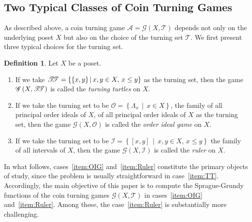 \documentclass[a4paper,11pt]{amsart}
\theoremstyle{definition}
\newtheorem{dfn}{Definition}[section]
\numberwithin{equation}{section}
\def\Game{\mathscr{A}}
\def\Pgame{\mathscr{G}}
\def\T{\mathscr{T}}
\def\TT{\mathscr{T}\kern-4pt\mathscr{T}}
\def\OI{\mathscr{O}}
\def\I{\mathscr{I}}
\begin{document}
\subsection{Two Typical Classes of Coin Turning Games}
%
As described above,
a coin turning game $\Game=\Pgame(X,\T)$ depends not only on the underlying poset $X$
but also on the choice of the turning set $\T$.
We first present three typical choices for the turning set.
%
\begin{dfn}
%
Let $X$ be a poset.
%
\begin{enumerate}[leftmargin=20pt,label=(\roman*)] %
	\item\label{item:TT}
	If we take
	$\TT=\left\{\{ x, y \}\, \middle| \,x, y \in X,\,x \leq y \right\}$ 
	as the turning set,
	then the game $\Pgame\left( X, \TT\right)$ is called the \textsl{turning turtles} on $X$.
	\item\label{item:OIG}
	If we take the turning set to be $\OI=\left\{\Lambda_{x} \, \middle| \, x \in X\right\}$,
	the family of all principal order ideals of $X$,
	of all principal order ideals of $X$  as the turning set,
	then the game $\Pgame(X,\OI)$ is called the \textsl{order ideal game} on $X$.
	\item\label{item:Ruler}
	If we take the turning set to be 
	$\I=\left\{[x,y]\, \middle| \, x,y\in X,\, x\leq y\right\}$ 
	the family of all intervals of $X$, then the game $\Pgame(X,\I)$ is called the \textsl{ruler} on $X$.
\end{enumerate} %
%
\end{dfn}
%
%
In what follows, cases~\ref{item:OIG} and~\ref{item:Ruler} constitute the primary objects of study, 
since the problem is usually straightforward in case~\ref{item:TT}.
Accordingly, the main objective of this paper is 
to compute the Sprague-Grundy functions of the coin turning games $\Pgame(X,\T)$ 
in cases~\ref{item:OIG} and~\ref{item:Ruler}.
Among these, the case~\ref{item:Ruler} is substantially more challenging.
%
\par\smallskip
%
%
\end{document}

